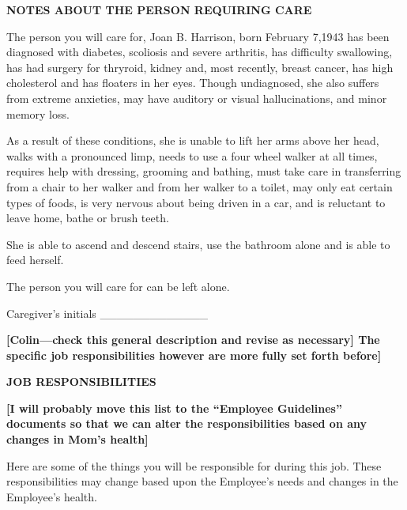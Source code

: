 \documentclass[]{article}
\begin{document}
\textbf{NOTES ABOUT THE PERSON REQUIRING CARE}

The person you will care for, Joan B. Harrison, born February 7,1943 has
been diagnosed with diabetes, scoliosis and severe arthritis, has
difficulty swallowing, has had surgery for thryroid, kidney and, most
recently, breast cancer, has high cholesterol and has floaters in her
eyes. Though undiagnosed, she also suffers from extreme anxieties, may
have auditory or visual hallucinations, and minor memory loss.

As a result of these conditions, she is unable to lift her arms above
her head, walks with a pronounced limp, needs to use a four wheel walker
at all times, requires help with dressing, grooming and bathing, must
take care in transferring from a chair to her walker and from her walker
to a toilet, may only eat certain types of foods, is very nervous about
being driven in a car, and is reluctant to leave home, bathe or brush
teeth.

She is able to ascend and descend stairs, use the bathroom alone and is
able to feed herself.

The person you will care for can be left alone.

Caregiver's initials \_\_\_\_\_\_\_\_\_\_\_\_\_

\textbf{{[}Colin---check this general description and revise as
necessary{]} The specific job responsibilities however are more fully
set forth before{]} }

\textbf{JOB RESPONSIBILITIES }

\textbf{{[}I will probably move this list to the ``Employee Guidelines''
documents so that we can alter the responsibilities based on any changes
in Mom's health{]}}

Here are some of the things you will be responsible for during this job.
These responsibilities may change based upon the Employee's needs and
changes in the Employee's health.
\end{document}
